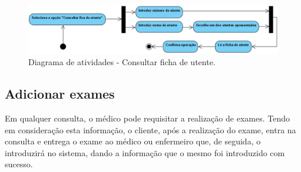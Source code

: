 \documentclass[11pt,a4paper,twoside]{report}
\begin{document}
\begin{figure}[H]
	\centering
	\includegraphics[width=0.7\linewidth]{image/Atividades/ConsultarFicha}
	\caption [Diagrama de atividades - Consultar ficha de utente.] {Diagrama de atividades - Consultar ficha de utente.}
	\label{fig:consultarfichautente}
\end{figure}


\subsection{Adicionar exames}

Em qualquer consulta, o médico pode requisitar a realização de exames. Tendo em consideração esta informação, o cliente, após a realização do exame, entra na consulta e entrega o exame ao médico ou enfermeiro que, de seguida, o introduzirá no sistema, dando a informação que o mesmo foi introduzido com sucesso. 
\end{document}
